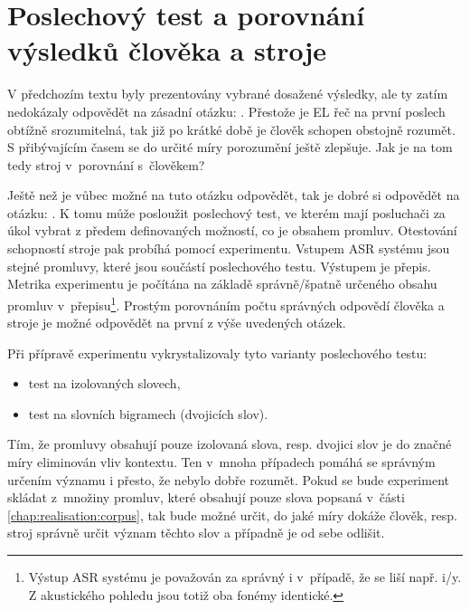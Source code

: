 \section{Poslechový test a porovnání výsledků člověka a stroje}
\label{chap:realisation:listening}

V předchozím textu byly prezentovány vybrané dosažené výsledky, ale ty zatím nedokázaly odpovědět na zásadní otázku: .
Přestože je EL řeč na první poslech obtížně srozumitelná, tak již po krátké době je člověk schopen obstojně rozumět.
S přibývajícím časem se do určité míry porozumění ještě zlepšuje.
Jak je na tom tedy stroj v~porovnání s~člověkem?

Ještě než je vůbec možné na tuto otázku odpovědět, tak je dobré si odpovědět na otázku: .
K tomu může posloužit poslechový test, ve kterém mají posluchači za úkol vybrat z předem definovaných možností, co je obsahem promluv.
Otestování schopností stroje pak probíhá pomocí experimentu.
Vstupem ASR systému jsou stejné promluvy, které jsou součástí poslechového testu.
Výstupem je přepis.
Metrika experimentu je počítána na základě správně/špatně určeného obsahu promluv v~přepisu\footnote{Výstup ASR systému je považován za správný i v~případě, že se liší např. i/y. Z akustického pohledu jsou totiž oba fonémy identické.}.
Prostým porovnáním počtu správných odpovědí člověka a stroje je možné odpovědět na první z výše uvedených otázek.

Při přípravě experimentu vykrystalizovaly tyto varianty poslechového testu:

\begin{itemize}
  \item test na izolovaných slovech,
  \item test na slovních bigramech (dvojicích slov).
\end{itemize}

\noindent Tím, že promluvy obsahují pouze izolovaná slova, resp. dvojici slov je do značné míry eliminován vliv kontextu.
Ten v~mnoha případech pomáhá se správným určením významu i přesto, že nebylo dobře rozumět.
Pokud se bude experiment skládat z~množiny promluv, které obsahují pouze slova popsaná v~části \ref{chap:realisation:corpus}, tak bude možné určit, do jaké míry dokáže člověk, resp. stroj správně určit význam těchto slov a případně je od sebe odlišit.


